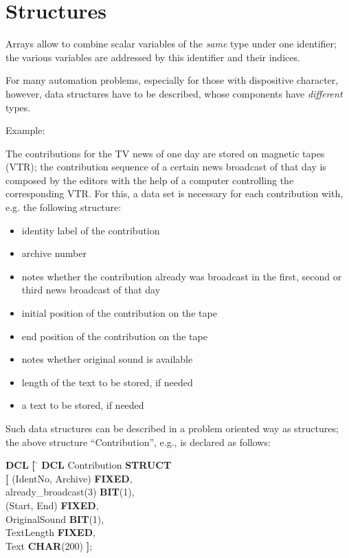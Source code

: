 \section{Structures}   %

Arrays allow to combine scalar variables of the {\it same} type under
one identifier; the various variables are addressed by this identifier
and their indices.

For many automation problems, especially for those with dispositive
character, however, data structures have to be described, whose
components have {\it different} types.

Example:

The contributions for the TV news of one day are stored on magnetic
tapes (VTR); the contribution sequence of a certain news broadcast of
that day is composed by the editors with the help of a computer
controlling the corresponding VTR. For this, a data set is necessary for
each contribution with, e.g. the following structure:

\begin{itemize}
\item identity label of the contribution
\item archive number
\item notes whether the contribution already was broadcast in the first,
second or third news broadcast of that day
\item initial position of the contribution on the tape
\item end position of the contribution on the tape
\item notes whether original sound is available
\item length of the text to be stored, if needed
\item a text to be stored, if needed
\end{itemize}

Such data structures can be described in a problem oriented way as
structures; the above structure ``Contribution'', e.g., is declared as
follows:

\begin{tabbing}
{\bf DCL} \= {\bf [} \= \kill
{\bf DCL} \>         \> Contribution {\bf STRUCT} \\
          \> {\bf [} \> (IdentNo, Archive) {\bf FIXED},\\
          \>         \> already\_broadcast(3) {\bf BIT}(1),\\
          \>         \> (Start, End) {\bf FIXED},\\
          \>         \> OriginalSound {\bf BIT}(1),\\
          \>         \> TextLength {\bf FIXED},\\
          \>         \> Text {\bf CHAR}(200) {\bf ]};
\end{tabbing}

